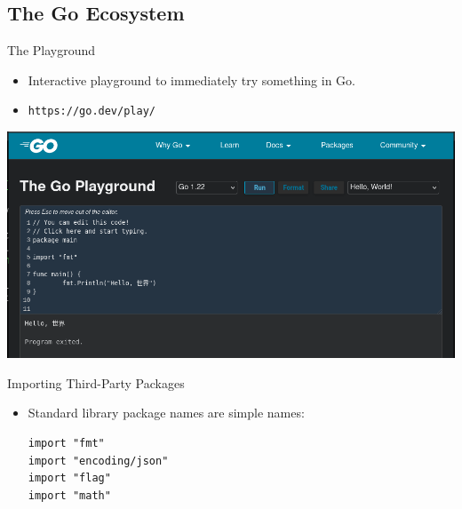 \documentclass[pdf]{beamer}
\newcommand\go[1]{\texttt{#1}}
\begin{document}
\subsection{The Go Ecosystem}
\begin{frame}{The Playground}
	\begin{itemize}
		\item Interactive playground to immediately try something in Go.
		\item \go{https://go.dev/play/}
	\end{itemize}
	\begin{center}
		\includegraphics[width=\textwidth]{playground}
	\end{center}
\end{frame}
\begin{frame}[fragile]{Importing Third-Party Packages}
	\begin{itemize}
		\item Standard library package names are simple names:
			\begin{lstlisting}
import "fmt"
import "encoding/json"
import "flag"
import "math"
\end{lstlisting}
	\end{itemize}
	\vfill
	\strut
\end{frame}
\end{document}
